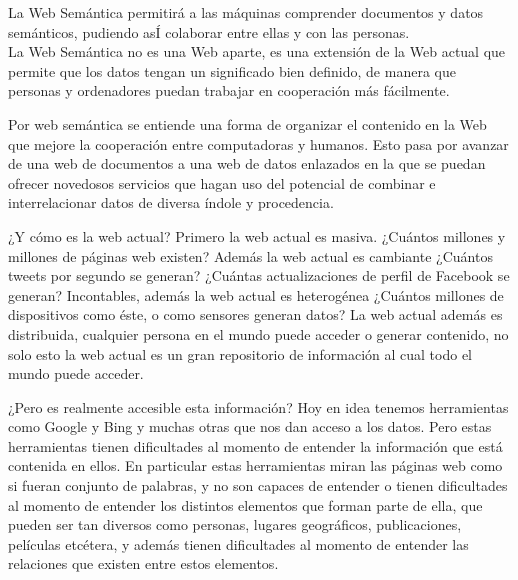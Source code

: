 





La Web Semántica permitirá a las máquinas comprender documentos y datos semánticos, pudiendo asÍ colaborar entre ellas y con las personas.\\

La Web Semántica no es una Web aparte, es una extensión de la Web actual que permite que los datos tengan un significado bien definido, de manera que personas y ordenadores puedan trabajar en cooperación más fácilmente.


Por web semántica se entiende una forma de organizar el contenido en la Web que mejore la cooperación entre computadoras y humanos. Esto pasa por avanzar de una web de documentos a una web de datos enlazados en la que se puedan ofrecer novedosos servicios que hagan uso del potencial de combinar e interrelacionar datos de diversa índole y procedencia.



 ¿Y cómo es la web actual? Primero la web actual es masiva. ¿Cuántos millones y millones de páginas web existen? Además la web actual es cambiante ¿Cuántos tweets por segundo se generan? ¿Cuántas actualizaciones de perfil de Facebook se generan? Incontables, además la web actual es heterogénea ¿Cuántos millones de dispositivos como éste, o como sensores generan datos? La web actual además es distribuida, cualquier persona en el mundo puede acceder o generar contenido, no solo esto la web actual es un gran repositorio de información al cual todo el mundo puede acceder.
 
 ¿Pero es realmente accesible esta información? Hoy en idea tenemos herramientas como Google y Bing y muchas otras que nos dan acceso a los datos. Pero estas herramientas tienen dificultades al momento de entender la información que está contenida en ellos. En particular estas herramientas miran las páginas web como si fueran conjunto de palabras, y no son capaces de entender o tienen dificultades al momento de entender los distintos elementos que forman parte de ella, que pueden ser tan diversos como personas, lugares geográficos, publicaciones, películas etcétera, y además tienen dificultades al momento de entender las relaciones que existen entre estos elementos.
 
